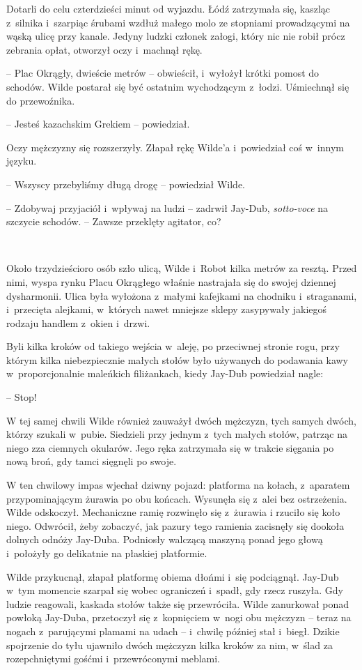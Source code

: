 \documentclass[oneside,polish,11pt,sfheadings]{mwbk}
\begin{document}
Dotarli do celu czterdzieści minut od wyjazdu. Łódź zatrzymała się,
kaszląc z~silnika i~szarpiąc śrubami wzdłuż małego molo ze stopniami
prowadzącymi na wąską ulicę przy kanale. Jedyny ludzki członek załogi,
który nic nie robił prócz zebrania opłat, otworzył oczy i~machnął rękę.

-- Plac Okrągły, dwieście metrów -- obwieścił, i~wyłożył krótki pomost do
schodów. Wilde postarał się być ostatnim wychodzącym z~łodzi. Uśmiechnął
się do przewoźnika.

-- Jesteś kazachskim Grekiem -- powiedział.

Oczy mężczyzny się rozszerzyły. Złapał rękę Wilde'a i~powiedział coś w~innym języku.

-- Wszyscy przebyliśmy długą drogę -- powiedział Wilde.

-- Zdobywaj przyjaciół i~wpływaj na ludzi -- zadrwił Jay-Dub,
\emph{sotto-voce} na szczycie schodów. -- Zawsze przeklęty agitator, co?

~

Około trzydzieścioro osób szło ulicą, Wilde i~Robot kilka metrów za
resztą. Przed nimi, wyspa rynku Placu Okrągłego właśnie nastrajała się
do swojej dziennej dysharmonii. Ulica była wyłożona z~małymi kafejkami
na chodniku i~straganami, i~przecięta alejkami, w~których nawet mniejsze
sklepy zasypywały jakiegoś rodzaju handlem z~okien i~drzwi.

Byli kilka kroków od takiego wejścia w~aleję, po przeciwnej stronie
rogu, przy którym kilka niebezpiecznie małych stołów było używanych do
podawania kawy w~proporcjonalnie maleńkich filiżankach, kiedy Jay-Dub
powiedział nagle: 

-- Stop!

W tej samej chwili Wilde również zauważył dwóch mężczyzn, tych samych
dwóch, którzy szukali w~pubie. Siedzieli przy jednym z~tych małych
stołów, patrząc na niego zza ciemnych okularów. Jego ręka zatrzymała się
w trakcie sięgania po nową broń, gdy tamci sięgnęli po swoje.

W ten chwilowy impas wjechał dziwny pojazd: platforma na kołach, z~aparatem przypominającym żurawia po obu końcach. Wysunęła się z~alei bez
ostrzeżenia. Wilde odskoczył. Mechaniczne ramię rozwinęło się z~żurawia
i rzuciło się koło niego. Odwrócił, żeby zobaczyć, jak pazury tego
ramienia zacisnęły się dookoła dolnych odnóży Jay-Duba. Podniosły
walczącą maszyną ponad jego głową i~położyły go delikatnie na płaskiej
platformie.

Wilde przykucnął, złapał platformę obiema dłońmi i~się podciągnął.
Jay-Dub w~tym momencie szarpał się wobec ograniczeń i~spadł, gdy rzecz
ruszyła. Gdy ludzie reagowali, kaskada stołów także się przewróciła.
Wilde zanurkował ponad powłoką Jay-Duba, przetoczył się z~kopnięciem w~nogi obu mężczyzn -- teraz na nogach z~parującymi plamami na udach -- i~chwilę później stał i~biegł. Dzikie spojrzenie do tyłu ujawniło dwóch
mężczyzn kilka kroków za nim, w~ślad za rozepchniętymi gośćmi i~przewróconymi meblami.
\end{document}
